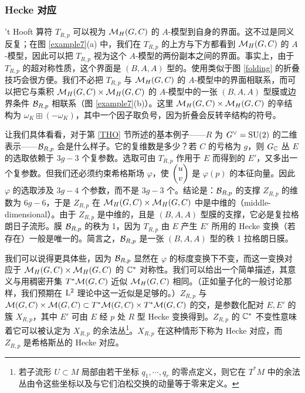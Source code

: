 \subsubsection{Hecke 对应}\label{HC}

't Hooft 算符 $T_{R,p}$ 可以视为 ${\mathcal M}_H(G,C)$ 的 $A$-模型到自身的界面。这不过是同义反复；在图 \ref{example7}(a) 中，我们在 $T_{R,p}$ 的上方与下方都看到 ${\mathcal M}_H(G,C)$ 的 $A$-模型，因此可以把 $T_{R,p}$ 视为这个 $A$-模型的两份副本之间的界面。事实上，由于 $T_{R,p}$ 的超对称性质，这个界面是 $(B,A,A)$ 型的。使用类似于图 \ref{folding} 的折叠技巧会很方便。我们不必把 $T_{R,p}$ 与 ${\mathcal M}_H(G,C)$ 的 $A$-模型中的界面相联系，而可以把它与乘积 ${\mathcal M}_H(G,C)\times {\mathcal M}_H(G,C)$ 的 $A$-模型中的一张 $(B,A,A)$ 型膜或边界条件 ${\mathcal B}_{R,p}$ 相联系（图 \ref{example7}(b)）。这里 ${\mathcal M}_H(G,C)\times {\mathcal M}_H(G,C)$ 的辛结构为 $\omega_K\boxplus (-\omega_K)$，其中一个因子取负号，因为折叠会反转辛结构的符号。

让我们具体看看，对于第 \ref{THO} 节所述的基本例子——$R$ 为 $G^\vee={\mathrm{SU}}(2)$ 的二维表示——${\mathcal B}_{R,p}$ 会是什么样子。它的复维数是多少？若 $C$ 的亏格为 $g$，则 $G_{\mathbb C}$ 丛 $E$ 的选取依赖于 $3g-3$ 个复参数。选取可由 $T_{R,p}$ 作用于 $E$ 而得到的 $E'$，又多出一个复参数。但我们还必须约束希格斯场 $\varphi$，使 $\begin{pmatrix}u\cr v\end{pmatrix}$ 是 $\varphi(p)$ 的本征向量。因此 $\varphi$ 的选取涉及 $3g-4$ 个参数，而不是 $3g-3$ 个。结论是：${\mathcal B}_{R,p}$ 的支撑 $Z_{R,p}$ 的维数为 $6g-6$，于是 $Z_{R,p}$ 在 ${\mathcal M}_H(G,C)\times {\mathcal M}_H(G,C)$ 中是中维的（middle-dimensional）。由于 $Z_{R,p}$ 是中维的，且是 $(B,A,A)$ 型膜的支撑，它必是复拉格朗日子流形。膜 ${\mathcal B}_{R,p}$ 的秩为 1，因为 $T_{R,p}$ 由 $E$ 产生 $E'$ 所用的 Hecke 变换（若存在）一般是唯一的。简言之，${\mathcal B}_{R,p}$ 是一张 $(B,A,A)$ 型的秩 1 拉格朗日膜。

我们可以说得更具体些，因为 ${\mathcal B}_{R,p}$ 显然在 $\varphi$ 的标度变换下不变，而这一变换对应于 ${\mathcal M}_H(G,C)\times {\mathcal M}_H(G,C)$ 的 ${\mathbb C}^*$ 对称性。我们可以给出一个简单描述，其意义与用稠密开集 $T^*{\mathcal M}(G,C)$ 近似 ${\mathcal M}_H(G,C)$ 相同。（正如量子化的一般讨论那样，我们预期在 ${\mathrm L}^2$ 理论中这一近似是足够的。）$Z_{R,p}$ 与 ${\mathcal M}(G,C)\times {\mathcal M}(G,C)\subset T^*{\mathcal M}(G,C)\times T^*{\mathcal M}(G,C)$ 的交，是参数化配对 $E,E'$ 的簇 $X_{R,p}$，其中 $E'$ 可由 $E$ 经 $p$ 处 $R$ 型 Hecke 变换得到。$Z_{R,p}$ 的 ${\mathbb C}^*$ 不变性意味着它可以被认定为 $X_{R,p}$ 的余法丛\footnote{若子流形 $U\subset M$ 局部由若干坐标 $q_1,\cdots, q_r$ 的零点定义，则它在 $T^*M$ 中的余法丛由令这些坐标以及与它们泊松交换的动量等于零来定义。}。$X_{R,p}$ 在这种情形下称为 Hecke 对应，而 $Z_{R,p}$ 是希格斯丛的 Hecke 对应。
   
